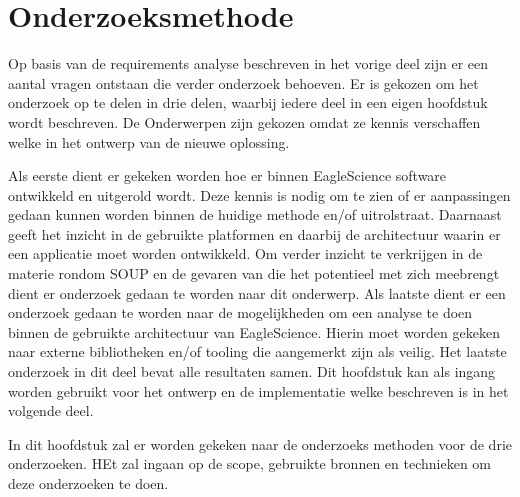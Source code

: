 \chapter{Onderzoeksmethode}\label{ch:onderzoeksmethode} %

Op basis van de requirements analyse beschreven in het vorige deel zijn er een aantal vragen ontstaan die verder onderzoek behoeven. Er is gekozen om het onderzoek op te delen in drie delen, waarbij iedere deel in een eigen hoofdstuk wordt beschreven. De Onderwerpen zijn gekozen omdat ze kennis verschaffen welke in het ontwerp van de nieuwe oplossing.

Als eerste dient er gekeken worden hoe er binnen EagleScience software ontwikkeld en uitgerold wordt. Deze kennis is nodig om te zien of er aanpassingen gedaan kunnen worden binnen de huidige methode en/of uitrolstraat. Daarnaast geeft het inzicht in de gebruikte platformen en daarbij de architectuur waarin er een applicatie moet worden ontwikkeld. Om verder inzicht te verkrijgen in de materie rondom SOUP en de gevaren van die het potentieel met zich meebrengt dient er onderzoek gedaan te worden naar dit onderwerp. Als laatste dient er een onderzoek gedaan te worden naar de mogelijkheden om een analyse te doen binnen de gebruikte architectuur van EagleScience. Hierin moet worden gekeken naar externe bibliotheken en/of tooling die aangemerkt zijn als veilig. Het laatste onderzoek in dit deel bevat alle resultaten samen. Dit hoofdstuk kan als ingang worden gebruikt voor het ontwerp en de implementatie welke beschreven is in het volgende deel.

In dit hoofdstuk zal er worden gekeken naar de onderzoeks methoden voor de drie onderzoeken. HEt zal ingaan op de scope, gebruikte bronnen en technieken om deze onderzoeken te doen.
%


